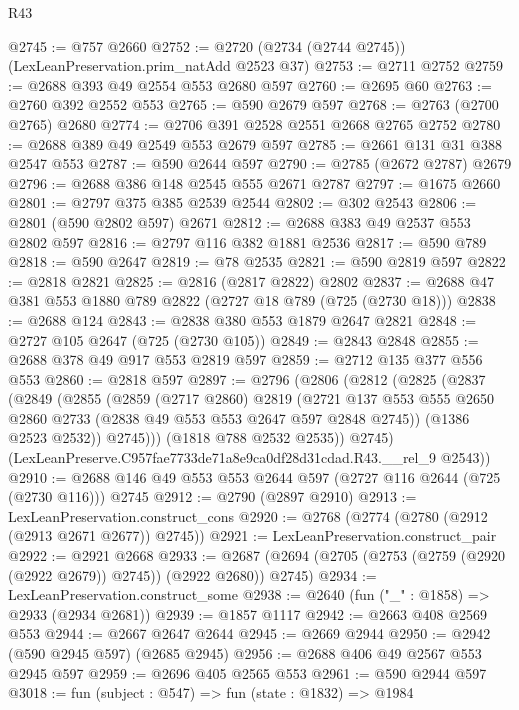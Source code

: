 \begin{lexlean}{R43}
\begin{coremodule}
@2745 := @757 @2660
@2752 := @2720 (@2734 (@2744 @2745)) (LexLeanPreservation.prim_natAdd @2523 @37)
@2753 := @2711 @2752
@2759 := @2688 @393 @49 @2554 @553 @2680 @597
@2760 := @2695 @60
@2763 := @2760 @392 @2552 @553
@2765 := @590 @2679 @597
@2768 := @2763 (@2700 @2765) @2680
@2774 := @2706 @391 @2528 @2551 @2668 @2765 @2752
@2780 := @2688 @389 @49 @2549 @553 @2679 @597
@2785 := @2661 @131 @31 @388 @2547 @553
@2787 := @590 @2644 @597
@2790 := @2785 (@2672 @2787) @2679
@2796 := @2688 @386 @148 @2545 @555 @2671 @2787
@2797 := @1675 @2660
@2801 := @2797 @375 @385 @2539 @2544
@2802 := @302 @2543
@2806 := @2801 (@590 @2802 @597) @2671
@2812 := @2688 @383 @49 @2537 @553 @2802 @597
@2816 := @2797 @116 @382 @1881 @2536
@2817 := @590 @789
@2818 := @590 @2647
@2819 := @78 @2535
@2821 := @590 @2819 @597
@2822 := @2818 @2821
@2825 := @2816 (@2817 @2822) @2802
@2837 := @2688 @47 @381 @553 @1880 @789 @2822 (@2727 @18 @789 (@725 (@2730 @18)))
@2838 := @2688 @124
@2843 := @2838 @380 @553 @1879 @2647 @2821
@2848 := @2727 @105 @2647 (@725 (@2730 @105))
@2849 := @2843 @2848
@2855 := @2688 @378 @49 @917 @553 @2819 @597
@2859 := @2712 @135 @377 @556 @553
@2860 := @2818 @597
@2897 := @2796
    (@2806
      (@2812
        (@2825
          (@2837
            (@2849
              (@2855
                (@2859
                  (@2717 @2860)
                  @2819
                  (@2721
                    @137
                    @553
                    @555
                    @2650
                    @2860
                    @2733
                    (@2838 @49 @553 @553 @2647 @597 @2848 @2745))
                  (@1386 @2523 @2532))
                @2745)))
          (@1818 @788 @2532 @2535))
        @2745)
      (LexLeanPreserve.C957fae7733de71a8e9ca0df28d31cdad.R43.__rel_9 @2543))
@2910 := @2688 @146 @49 @553 @553 @2644 @597 (@2727 @116 @2644 (@725 (@2730 @116))) @2745
@2912 := @2790 (@2897 @2910)
@2913 := LexLeanPreservation.construct_cons
@2920 := @2768 (@2774 (@2780 (@2912 (@2913 @2671 @2677)) @2745))
@2921 := LexLeanPreservation.construct_pair
@2922 := @2921 @2668
@2933 := @2687 (@2694 (@2705 (@2753 (@2759 (@2920 (@2922 @2679)) @2745)) (@2922 @2680)) @2745)
@2934 := LexLeanPreservation.construct_some
@2938 := @2640 (fun ("_" : @1858) => @2933 (@2934 @2681))
@2939 := @1857 @1117
@2942 := @2663 @408 @2569 @553
@2944 := @2667 @2647 @2644
@2945 := @2669 @2944
@2950 := @2942 (@590 @2945 @597) (@2685 @2945)
@2956 := @2688 @406 @49 @2567 @553 @2945 @597
@2959 := @2696 @405 @2565 @553
@2961 := @590 @2944 @597
@3018 := fun (subject : @547) =>
  fun (state : @1832) =>
  @1984

\end{coremodule}
\end{lexlean}

